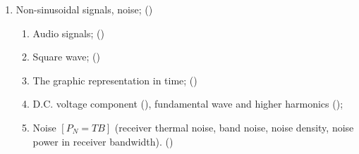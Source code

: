 \begin{flushleft}
\begin{enumerate}
\begin{enumerate}
\item Non-sinusoidal signals, noise; ()\label{HAREC.a.1.7}
\begin{enumerate}
\item Audio signals; ()\label{HAREC.a.1.7.1}
\item Square wave; ()\label{HAREC.a.1.7.2}
\item The graphic representation in time;
  ()\label{HAREC.a.1.7.3}
\item D.C. voltage component ()\label{HAREC.a.1.7.4a},
  fundamental wave and higher harmonics
  ()\label{HAREC.a.1.7.4b};
\item Noise \(\left[P_N=TB\right]\) (receiver thermal noise, band noise,
  noise density, noise power in receiver bandwidth).
  ()\label{HAREC.a.1.7.5}
\end{enumerate}


\end{enumerate}
\end{enumerate}
\end{flushleft}
